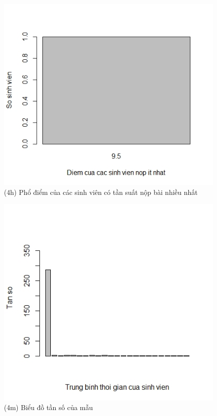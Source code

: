 \documentclass[a4paper]{article}
\theoremstyle{definition}
\begin{document}
\begin{figure}[!ht]
    \centering
    \includegraphics[scale=0.4]{Pics/q4h-file4.jpeg}
    \caption{(4h) Phổ điểm của các sinh viên có tần suất nộp bài nhiều nhất}
    \label{fig:my_label}
\end{figure}
\begin{figure}[!ht]
    \centering
    \includegraphics[scale=0.4]{Pics/q4m-file4.jpeg}
    \caption{(4m) Biểu đồ tần số của mẫu}
    \label{fig:my_label}
\end{figure}
\end{document}
